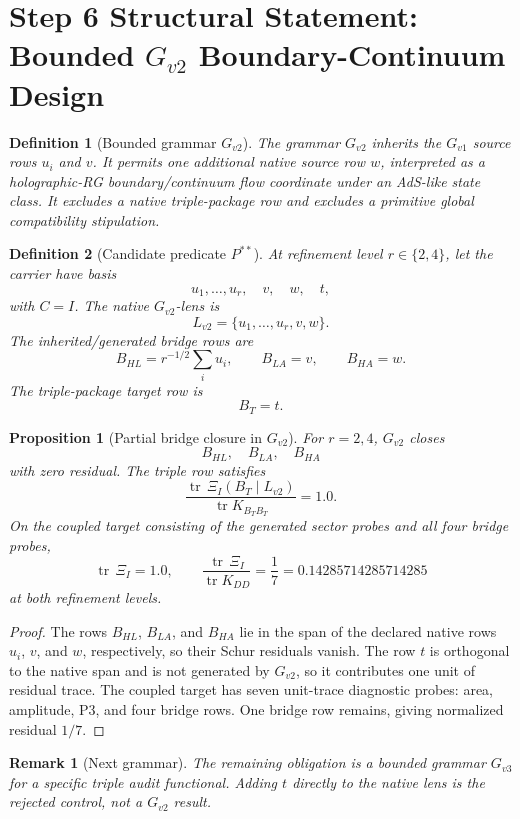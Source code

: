 \documentclass[11pt]{article}
\newtheorem{definition}{Definition}
\newtheorem{proposition}{Proposition}
\newtheorem{remark}{Remark}
\DeclareMathOperator{\tr}{tr}
\begin{document}
\section*{Step 6 Structural Statement: Bounded \(G_{v2}\) Boundary-Continuum Design}

\begin{definition}[Bounded grammar \(G_{v2}\)]
The grammar \(G_{v2}\) inherits the \(G_{v1}\) source rows \(u_i\) and \(v\).
It permits one additional native source row \(w\), interpreted as a
holographic-RG boundary/continuum flow coordinate under an AdS-like state
class.  It excludes a native triple-package row and excludes a primitive
global compatibility stipulation.
\end{definition}

\begin{definition}[Candidate predicate \(P^{**}\)]
At refinement level \(r\in\{2,4\}\), let the carrier have basis
\[
  u_1,\ldots,u_r,\quad v,\quad w,\quad t,
\]
with \(C=I\).  The native \(G_{v2}\)-lens is
\[
  L_{v2}=\{u_1,\ldots,u_r,v,w\}.
\]
The inherited/generated bridge rows are
\[
  B_{HL}=r^{-1/2}\sum_i u_i,\qquad
  B_{LA}=v,\qquad
  B_{HA}=w.
\]
The triple-package target row is
\[
  B_T=t.
\]
\end{definition}

\begin{proposition}[Partial bridge closure in \(G_{v2}\)]
For \(r=2,4\), \(G_{v2}\) closes
\[
  B_{HL},\quad B_{LA},\quad B_{HA}
\]
with zero residual.  The triple row satisfies
\[
  \frac{\tr\,\Xi_I(B_T\mid L_{v2})}{\tr K_{B_TB_T}}=1.0.
\]
On the coupled target consisting of the generated sector probes and all four
bridge probes,
\[
  \tr\,\Xi_I=1.0,\qquad
  \frac{\tr\,\Xi_I}{\tr K_{DD}}=\frac{1}{7}=0.14285714285714285
\]
at both refinement levels.
\end{proposition}

\begin{proof}
The rows \(B_{HL}\), \(B_{LA}\), and \(B_{HA}\) lie in the span of the declared
native rows \(u_i\), \(v\), and \(w\), respectively, so their Schur residuals
vanish.  The row \(t\) is orthogonal to the native span and is not generated by
\(G_{v2}\), so it contributes one unit of residual trace.  The coupled target
has seven unit-trace diagnostic probes: area, amplitude, P3, and four bridge
rows.  One bridge row remains, giving normalized residual \(1/7\).
\end{proof}

\begin{remark}[Next grammar]
The remaining obligation is a bounded grammar \(G_{v3}\) for a specific triple
audit functional.  Adding \(t\) directly to the native lens is the rejected
control, not a \(G_{v2}\) result.
\end{remark}
\end{document}
